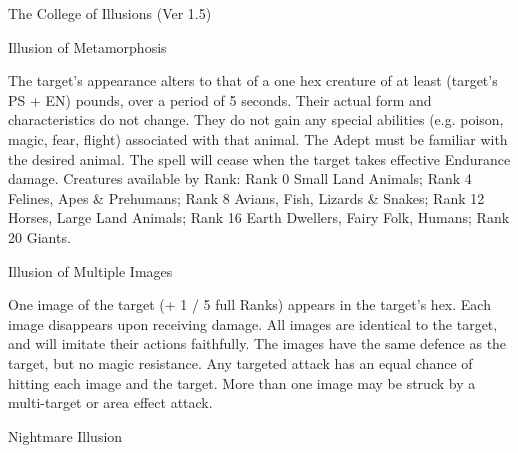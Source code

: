 \begin{Chapter}{The College of Illusions (Ver 1.5)}
\begin{spell}[S-11]{Illusion of Metamorphosis}

\begin{effects}
The target’s appearance alters to that of a one hex creature of at
least (target’s PS + EN) pounds, over a period of 5 seconds.  Their
actual form and characteristics do not change.  They do not gain any
special abilities (e.g.  poison, magic, fear, flight) associated with
that animal. The Adept must be familiar with the desired animal. The
spell will cease when the target takes effective Endurance damage.
Creatures available by Rank: Rank 0 Small Land Animals; Rank 4
Felines, Apes \& Prehumans; Rank 8 Avians, Fish, Lizards \& Snakes;
Rank 12 Horses, Large Land Animals; Rank 16 Earth Dwellers, Fairy
Folk, Humans; Rank 20 Giants.
\end{effects}
\end{spell}

\begin{spell}[S-13]{Illusion of Multiple Images}

\begin{effects}
One image of the target (+ 1 / 5 full Ranks) appears in the target’s
hex. Each image disappears upon receiving damage. All images are
identical to the target, and will imitate their actions faithfully.
The images have the same defence as the target, but no magic
resistance. Any targeted attack has an equal chance of hitting each
image and the target.  More than one image may be struck by a
multi-target or area effect attack.
\end{effects}
\end{spell}

\begin{spell}[S-14]{Nightmare Illusion}


\end{spell}
\end{Chapter}

